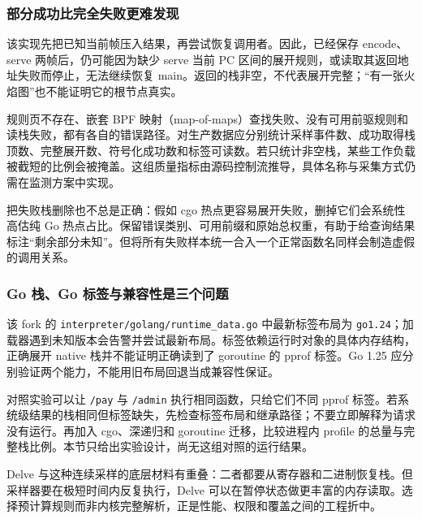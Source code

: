 \documentclass[UTF8,fontset=fandol,openany,11pt]{ctexbook}
\begin{document}
\subsubsection{部分成功比完全失败更难发现}
该实现先把已知当前帧压入结果，再尝试恢复调用者。因此，已经保存 encode、serve 两帧后，仍可能因为缺少 serve 当前 PC 区间的展开规则，或读取其返回地址失败而停止，无法继续恢复 main。返回的栈非空，不代表展开完整；“有一张火焰图”也不能证明它的根节点真实。

规则页不存在、嵌套 BPF 映射（map-of-maps）查找失败、没有可用前驱规则和读栈失败，都有各自的错误路径。对生产数据应分别统计采样事件数、成功取得栈顶数、完整展开数、符号化成功数和标签可读数。若只统计非空栈，某些工作负载被截短的比例会被掩盖。这组质量指标由源码控制流推导，具体名称与采集方式仍需在监测方案中实现。

把失败栈删除也不总是正确：假如 cgo 热点更容易展开失败，删掉它们会系统性高估纯 Go 热点占比。保留错误类别、可用前缀和原始总权重，有助于给查询结果标注“剩余部分未知”。但将所有失败样本统一合入一个正常函数名同样会制造虚假的调用关系。

\subsubsection{Go 栈、Go 标签与兼容性是三个问题}
该 fork 的 \texttt{interpreter/\allowbreak{}golang/\allowbreak{}runtime\_\allowbreak{}data.\allowbreak{}go} 中最新标签布局为 \texttt{go1.\allowbreak{}24}；加载器遇到未知版本会告警并尝试最新布局。标签依赖运行时对象的具体内存结构，正确展开 native 栈并不能证明正确读到了 goroutine 的 pprof 标签。Go 1.25 应分别验证两个能力，不能用旧布局回退当成兼容性保证。\cite{proj-otel-ebpf}

对照实验可以让 \texttt{/\allowbreak{}pay} 与 \texttt{/\allowbreak{}admin} 执行相同函数，只给它们不同 pprof 标签。若系统级结果的栈相同但标签缺失，先检查标签布局和继承路径；不要立即解释为请求没有运行。再加入 cgo、深递归和 goroutine 迁移，比较进程内 profile 的总量与完整栈比例。本节只给出实验设计，尚无这组对照的运行结果。

Delve 与这种连续采样的底层材料有重叠：二者都要从寄存器和二进制恢复栈。但采样器要在极短时间内反复执行，Delve 可以在暂停状态做更丰富的内存读取。选择预计算规则而非内核完整解析，正是性能、权限和覆盖之间的工程折中。
\end{document}
